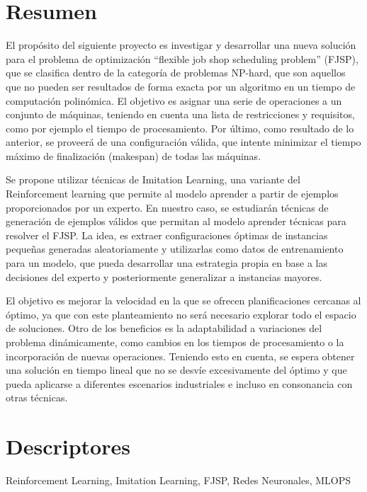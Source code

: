 \section*{Resumen}
El propósito del siguiente proyecto es investigar y desarrollar una nueva solución para el 
problema de optimización “flexible job shop scheduling problem” (FJSP), que se clasifica dentro 
de la categoría de problemas NP-hard, que son aquellos que no pueden ser resultados de forma 
exacta por un algoritmo en un tiempo de computación polinómica. El objetivo es asignar una 
serie de operaciones a un conjunto de máquinas, teniendo en cuenta una lista de restricciones 
y requisitos, como por ejemplo el tiempo de procesamiento. Por último, como resultado de lo 
anterior, se proveerá de una configuración válida, que intente minimizar el tiempo máximo de 
finalización (makespan) de todas las máquinas.\medskip 

Se propone utilizar técnicas de Imitation Learning, una variante del Reinforcement learning 
que permite al modelo aprender a partir de ejemplos proporcionados por un experto. En nuestro 
caso, se estudiarán técnicas de generación de ejemplos válidos que permitan al modelo aprender 
técnicas para resolver el FJSP. La idea, es extraer configuraciones óptimas de instancias 
pequeñas generadas aleatoriamente y utilizarlas como datos de entrenamiento para un modelo, 
que pueda desarrollar una estrategia propia en base a las decisiones del experto y posteriormente 
generalizar a instancias mayores.\medskip 

El objetivo es mejorar la velocidad en la que se ofrecen planificaciones cercanas al óptimo, 
ya que con este planteamiento no será necesario explorar todo el espacio de soluciones. Otro 
de los beneficios es la adaptabilidad a variaciones del problema dinámicamente, como cambios 
en los tiempos de procesamiento o la incorporación de nuevas operaciones. Teniendo esto en 
cuenta, se espera obtener una solución en tiempo lineal que no se desvíe excesivamente del 
óptimo y que pueda aplicarse a diferentes escenarios industriales e incluso en consonancia 
con otras técnicas.

\section*{Descriptores}
Reinforcement Learning, Imitation Learning, FJSP, Redes Neuronales, MLOPS
\pagebreak